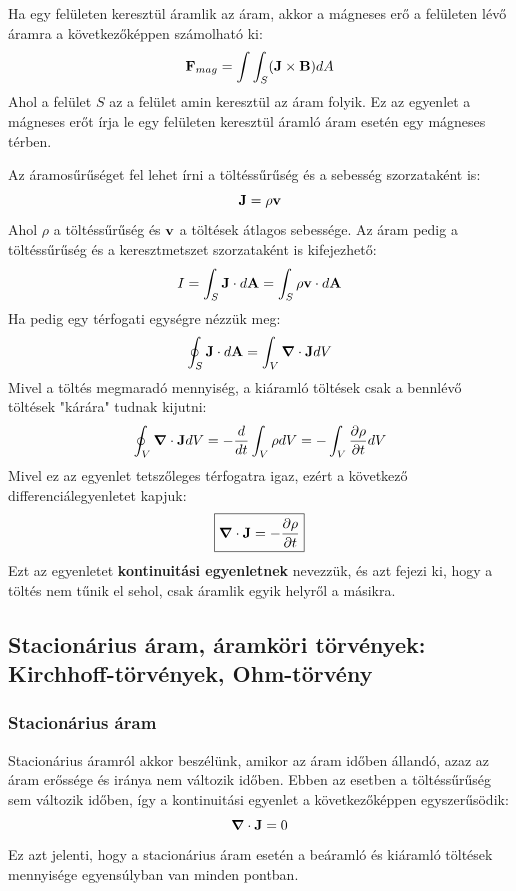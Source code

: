 \documentclass[a4paper,12pt]{article}
\begin{document}
Ha egy felületen keresztül áramlik az áram, akkor a mágneses erő a felületen lévő áramra a következőképpen számolható ki:
\begin{equation}
    \bold{F}_{mag} = \int \int_S (\bold{J} \times \bold{B}) dA
\end{equation}
Ahol a felület $S$ az a felület amin keresztül az áram folyik. Ez az egyenlet a mágneses erőt írja le egy felületen keresztül áramló áram esetén egy mágneses térben.

Az áramosűrűséget fel lehet írni a töltéssűrűség és a sebesség szorzataként is:
\begin{equation}
    \bold{J} = \rho \bold{v}
\end{equation}
Ahol $\rho$ a töltéssűrűség és $\bold{v}$ a töltések átlagos sebessége. Az áram pedig a töltéssűrűség és a keresztmetszet szorzataként is kifejezhető:
\begin{equation}
    I = \int_S \bold{J} \cdot d\bold{A} = \int_S \rho \bold{v} \cdot d\bold{A}
\end{equation}
Ha pedig egy térfogati egységre nézzük meg:
\begin{equation}
    \oint_S \bold{J} \cdot d\bold{A} = \int_V \boldsymbol{\nabla} \cdot \bold{J} dV
\end{equation}
Mivel a töltés megmaradó mennyiség, a kiáramló töltések csak a bennlévő töltések "kárára" tudnak kijutni:
\begin{equation}
    \oint_V \boldsymbol{\nabla} \cdot \bold{J} dV = - \frac{d}{dt} \int_V \rho dV = - \int_V \frac{\partial \rho}{\partial t} dV
\end{equation}
Mivel ez az egyenlet tetszőleges térfogatra igaz, ezért a következő differenciálegyenletet kapjuk:
\begin{equation}
    \boxed{\boldsymbol{\nabla} \cdot \bold{J} = - \frac{\partial \rho}{\partial t}}
\end{equation}
Ezt az egyenletet \textbf{kontinuitási egyenletnek} nevezzük, és azt fejezi ki, hogy a töltés nem tűnik el sehol, csak áramlik egyik helyről a másikra.


\subsection{Stacionárius áram, áramköri törvények: Kirchhoff-törvények, Ohm-törvény}

\subsubsection{Stacionárius áram}
Stacionárius áramról akkor beszélünk, amikor az áram időben állandó, azaz az áram erőssége és iránya nem változik időben. Ebben az esetben a töltéssűrűség sem változik időben, így a kontinuitási egyenlet a következőképpen egyszerűsödik:
\begin{equation}
    \boldsymbol{\nabla} \cdot \bold{J} = 0
\end{equation}
Ez azt jelenti, hogy a stacionárius áram esetén a beáramló és kiáramló töltések mennyisége egyensúlyban van minden pontban.
\end{document}
